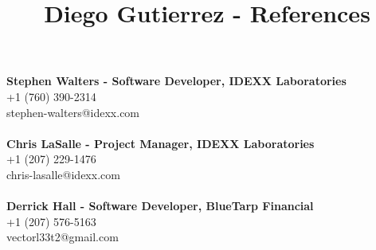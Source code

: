 \documentclass[10pt]{article}
\title{Diego Gutierrez - References}
\date{}
\author{}
\makeatletter
\renewcommand{\maketitle}{\bgroup\setlength{\parindent}{0pt}
	\begin{flushleft}
		\LARGE\textbf{\@title}
		
		\normalsize\@author
	\end{flushleft}\egroup
}
\makeatother
\begin{document}
\maketitle
\thispagestyle{empty} %
\noindent\textbf{Stephen Walters - Software Developer, IDEXX Laboratories}\\
\normalsize +1 (760) 390-2314 \\
stephen-walters@idexx.com \\
\\
\noindent\textbf{Chris LaSalle - Project Manager, IDEXX Laboratories}\\
\normalsize +1 (207) 229-1476\\
chris-lasalle@idexx.com\\
\\
\noindent\textbf{Derrick Hall - Software Developer, BlueTarp Financial}\\
\normalsize +1 (207) 576-5163\\
vectorl33t2@gmail.com\\
\end{document}

